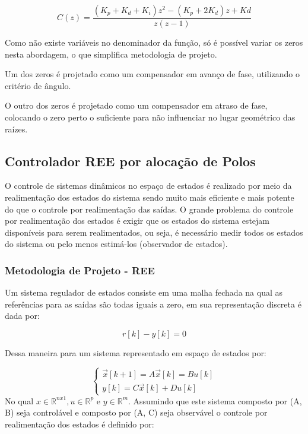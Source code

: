 \documentclass[conference,harvard,brazil,english]{sbatex}
\begin{document}
                \begin{equation}
                    C(z) = \frac{(K_p + K_d + K_i)z^2 - (K_p + 2K_d)z + Kd} {z(z-1)}
                \end{equation}
                
                Como não existe variáveis no denominador da função, só é possível variar os zeros nesta abordagem, o que simplifica metodologia de projeto.
                
                Um dos zeros é projetado como um compensador em avanço de fase, utilizando o critério de ângulo.
                
                O outro dos zeros é projetado como um compensador em atraso de fase, colocando o zero perto o suficiente para não influenciar no lugar geométrico das raízes.
        
        \subsection{Controlador REE por alocação de Polos}
        
            O controle de sistemas dinâmicos no espaço de estados é realizado por meio da realimentação dos estados do sistema sendo muito mais eficiente e mais potente do que o controle por realimentação das saídas. O grande problema do controle por realimentação dos estados é exigir que os estados do sistema estejam disponíveis para serem realimentados, ou seja, é necessário medir todos os estados do sistema ou pelo menos estimá-los (observador de estados). 
            
            \subsubsection{Metodologia de Projeto - REE}            
            Um sistema regulador de estados consiste em uma malha fechada na qual as referências para as saídas são todas iguais a zero, em sua representação discreta é dada por:
            
            \begin{equation}
                r[k]-y[k]=0
            \end{equation}
           
           Dessa maneira para um sistema representado em espaço de estados por:
           
           \begin{equation}
               \left\{\begin{matrix}
                    \vec{x}[k+1]=A\vec{x}[k]=Bu[k] \\
                    y[k]=C\vec{x}[k]+Du[k]
                \end{matrix}\right.
           \end{equation}
            No qual $x\in \mathbb{R}^{nx1}, u\in\mathbb{R}^{p}$ e $y\in \mathbb{R}^{m}$. Assumindo que este sistema composto por (A, B) seja controlável e composto por (A, C) seja observável o controle por realimentação dos estados é definido por:
           
\end{document}
